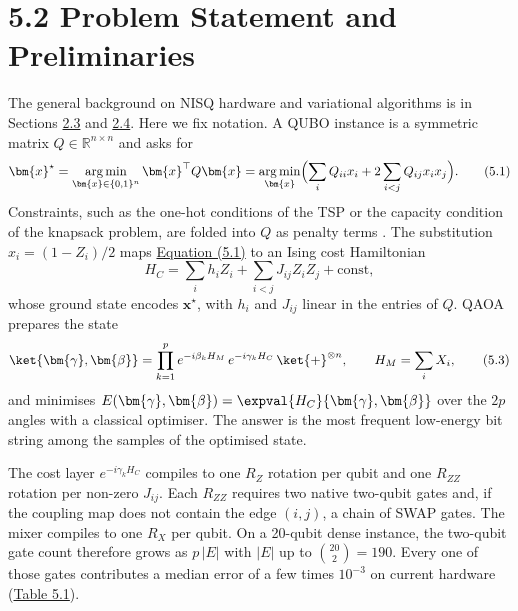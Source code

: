 \documentclass{report}
\theoremstyle{plain}
\theoremstyle{definition}
\theoremstyle{remark}
\newcommand{\R}{\mathbb{R}}
\DeclareMathOperator*{\argmin}{arg\,min}
\begin{document}
\section{5.2 Problem Statement and Preliminaries}\label{sec:nisq:problem}

The general background on NISQ hardware and variational algorithms is in Sections \hyperref[sec:bg:nisq]{2.3} and \hyperref[sec:bg:vqa]{2.4}. Here we fix notation. A QUBO instance is a symmetric matrix $Q\in\R^{n\times n}$ and asks for
\hypertarget{eq:nisq:qubo}{}\[
  \bm{x}^{\star} = \argmin_{\bm{x}\in\{0,1\}^{n}} \bm{x}^{\top} Q \bm{x}
  = \argmin_{\bm{x}} \Bigl(\sum_{i} Q_{ii}x_{i} + 2\sum_{i<j} Q_{ij}x_{i}x_{j}\Bigr).
\tag{5.1}\]
Constraints, such as the one-hot conditions of the TSP or the capacity condition of the knapsack problem, are folded into $Q$ as penalty terms \cite{glover2018qubo,montanezbarrera2024unbalanced}. The substitution $x_{i}=(1-Z_{i})/2$ maps \hyperref[eq:nisq:qubo]{Equation (5.1)} to an Ising cost Hamiltonian
\hypertarget{eq:nisq:ising}{}\[
  H_C = \sum_{i} h_{i} Z_{i} + \sum_{i<j} J_{ij} Z_{i}Z_{j} + \text{const},
\tag{5.2}\]
whose ground state encodes $\bm{x}^{\star}$, with $h_{i}$ and $J_{ij}$ linear in the entries of $Q$. QAOA prepares the state
\hypertarget{eq:nisq:qaoa}{}\[
  \ket{\bm{\gamma},\bm{\beta}} = \prod_{k=1}^{p} e^{-i\beta_{k}H_M}\, e^{-i\gamma_{k}H_C}\, \ket{+}^{\otimes n},
  \qquad H_M = \sum_{i} X_{i},
\tag{5.3}\]
and minimises $E(\bm{\gamma},\bm{\beta})=\expval{H_C}{\bm{\gamma},\bm{\beta}}$ over the $2p$ angles with a classical optimiser. The answer is the most frequent low-energy bit string among the samples of the optimised state.

The cost layer $e^{-i\gamma_{k}H_C}$ compiles to one $R_{Z}$ rotation per qubit and one $R_{ZZ}$ rotation per non-zero $J_{ij}$. Each $R_{ZZ}$ requires two native two-qubit gates and, if the coupling map does not contain the edge $(i,j)$, a chain of SWAP gates. The mixer compiles to one $R_{X}$ per qubit. On a 20-qubit dense instance, the two-qubit gate count therefore grows as $p\,|E|$ with $|E|$ up to $\binom{20}{2}=190$. Every one of those gates contributes a median error of a few times $10^{-3}$ on current hardware (\hyperref[tab:nisq:hw]{Table 5.1}).
\end{document}
